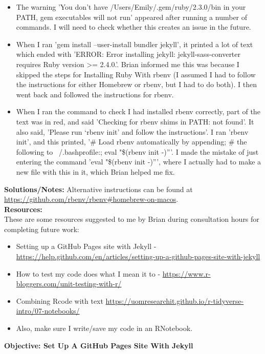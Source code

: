 \documentclass{article}
\begin{document}
\begin{FlushLeft}
\begin{itemize}
    \item The warning 'You don't have /Users/Emily/.gem/ruby/2.3.0/bin in your PATH, gem executables will not run' appeared after running a number of commands. I will need to check whether this creates an issue in the future.
    \item When I ran 'gem install --user-install bundler jekyll', it printed a lot of text which ended with 'ERROR:  Error installing jekyll:
	jekyll-sass-converter requires Ruby version >= 2.4.0.'. Brian informed me this was because I skipped the steps for Installing Ruby With rbenv (I assumed I had to follow the instructions for either Homebrew or rbenv, but I had to do both). I then went back and followed the instructions for rbenv.
    \item When I ran the command to check I had installed rbenv correctly, part of the text was in red, and said 'Checking for rbenv shims in PATH: not found'. It also said, 'Please run `rbenv init' and follow the instructions'. I ran 'rbenv init', and this printed, '\# Load rbenv automatically by appending; \# the following to ~/.bash\textunderscore profile:; eval "\$(rbenv init -)”'. I made the mistake of just entering the command 'eval "\$(rbenv init -)”', where I actually had to make a new file with this in it, which Brian helped me fix.
\end{itemize}
\textbf{Solutions/Notes:} Alternative instructions can be found at \url{https://github.com/rbenv/rbenv#homebrew-on-macos}.\\
\vspace{5mm}
\textbf{Resources:}\\ 
These are some resources suggested to me by Brian during consultation hours for completing future work:
\begin{itemize}
    \item Setting up a GitHub Pages site with Jekyll - \url{https://help.github.com/en/articles/setting-up-a-github-pages-site-with-jekyll}
    \item How to test my code does what I mean it to - \url{https://www.r-bloggers.com/unit-testing-with-r/}
    \item Combining Rcode with text \url{https://uomresearchit.github.io/r-tidyverse-intro/07-notebooks/}
    \item Also, make sure I write/save my code in an RNotebook.
\end{itemize}
\vspace{5mm}
\textbf{Objective: Set Up A GitHub Pages Site With Jekyll}\\ 

\end{FlushLeft}
\end{document}
